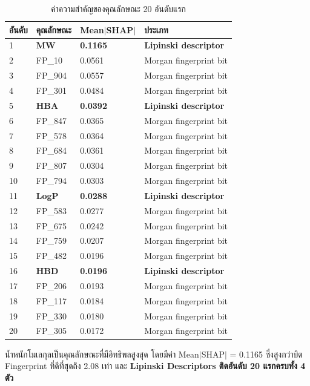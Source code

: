 \begin{table}[H]
\centering
\caption{ค่าความสำคัญของคุณลักษณะ 20 อันดับแรก}
\label{tab:shapimp}
\small
\begin{tabular}{C{1.4cm} L{2.6cm} R{2.6cm} L{4.6cm}}
\toprule
\textbf{อันดับ} & \textbf{คุณลักษณะ} & \textbf{Mean$|$SHAP$|$} & \textbf{ประเภท}\\
 & \textbf{MW} & \textbf{0.1165} & \textbf{Lipinski descriptor}\\
2 & FP\_10 & 0.0561 & Morgan fingerprint bit\\
3 & FP\_904 & 0.0557 & Morgan fingerprint bit\\
4 & FP\_301 & 0.0484 & Morgan fingerprint bit\\
5 & \textbf{HBA} & \textbf{0.0392} & \textbf{Lipinski descriptor}\\
6 & FP\_847 & 0.0365 & Morgan fingerprint bit\\
7 & FP\_578 & 0.0364 & Morgan fingerprint bit\\
8 & FP\_684 & 0.0361 & Morgan fingerprint bit\\
9 & FP\_807 & 0.0304 & Morgan fingerprint bit\\
10 & FP\_794 & 0.0303 & Morgan fingerprint bit\\
11 & \textbf{LogP} & \textbf{0.0288} & \textbf{Lipinski descriptor}\\
12 & FP\_583 & 0.0277 & Morgan fingerprint bit\\
13 & FP\_675 & 0.0242 & Morgan fingerprint bit\\
14 & FP\_759 & 0.0207 & Morgan fingerprint bit\\
15 & FP\_482 & 0.0196 & Morgan fingerprint bit\\
16 & \textbf{HBD} & \textbf{0.0196} & \textbf{Lipinski descriptor}\\
17 & FP\_206 & 0.0193 & Morgan fingerprint bit\\
18 & FP\_117 & 0.0184 & Morgan fingerprint bit\\
19 & FP\_330 & 0.0180 & Morgan fingerprint bit\\
20 & FP\_305 & 0.0172 & Morgan fingerprint bit\\
\bottomrule
\end{tabular}
\end{table}

\begin{keynote}
น้ำหนักโมเลกุลเป็นคุณลักษณะที่มีอิทธิพลสูงสุด โดยมีค่า Mean$|$SHAP$|$ = 0.1165 ซึ่งสูงกว่าบิต Fingerprint ที่ดีที่สุดถึง 2.08 เท่า และ \textbf{Lipinski Descriptors ติดอันดับ 20 แรกครบทั้ง 4 ตัว}
\end{keynote}

